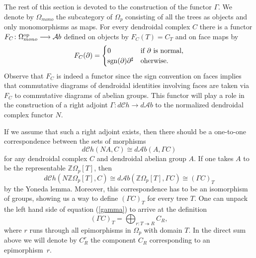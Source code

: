 \documentclass[a4paper]{amsart}
\newcommand{\Z}{{\mathbb Z}}
\theoremstyle{plain}
\theoremstyle{definition}
\theoremstyle{remark}
\DeclareMathOperator{\sgn}{sgn}
\newcommand{\rpd}{\Omega_p}
\newcommand{\To}{\longrightarrow}
\newcommand{\A}{\mathcal{A}b}
\newcommand{\dCh}{d\mathcal{C}h}
\newcommand{\dAb}{d\mathcal{A}b}
\numberwithin{equation}{section}
\numberwithin{figure}{section}
\begin{document}
The rest of this section is devoted to the construction of the
functor $\Gamma$. We denote by $\Omega_{mono}$ the subcategory of
$\rpd$ consisting of all the trees as objects and only monomorphisms
as maps. For every dendroidal complex $C$ there is a functor
$F_C\colon \Omega_{mono}^{\rm op}\To\A$ defined on objects by
$F_C(T)=C_T$ and on face maps by
\[
    F_C(\partial)=
    \begin{cases}
        0                             & \textnormal{if $\partial$ is normal,} \\
        \sgn(\partial)\partial^\sharp & \textnormal{oherwise.}
    \end{cases}
\]
Observe that $F_C$ is indeed a functor since the sign convention on
faces implies that commutative diagrams of dendroidal identities
involving faces are taken via $F_C$ to commutative diagrams of
abelian groups. This functor will play a role in the construction of
a right adjoint $\Gamma\colon \dCh\To \dAb$ to the normalized
dendroidal complex functor $N$.

If we assume that such a right adjoint exists, then there should be
a one-to-one correspondence between the sets of morphisms
\[
    \dCh(NA,C)\cong \dAb(A, \Gamma C)
\]
for any dendroidal complex $C$ and dendroidal abelian group $A$. If one takes $A$ to be the representable $\Z\rpd[T]$, then
\begin{equation}\label{gamma}
    \dCh(N\Z\rpd[T], C)\cong\dAb(\Z\rpd[T],\Gamma C)\cong (\Gamma C)_T
\end{equation}
by the Yoneda lemma. Moreover, this correspondence has to be an isomorphism of groups, showing us a way to define $(\Gamma C)_T$ for every tree $T$.
One can unpack the left hand side of equation (\ref{gamma}) to arrive at the definition
\[
    (\Gamma C)_T=\bigoplus_{r\colon T\twoheadrightarrow R}C_R,
\]
where $r$ runs through all epimorphisms in $\rpd$ with domain $T$. In the direct sum above we will denote by $C_R^r$ the component $C_R$ corresponding to an epimorphism~$r$.
\end{document}
